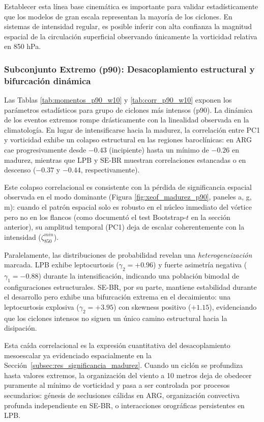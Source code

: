 Establecer esta línea base cinemática es importante para validar estadísticamente que los modelos de gran escala representan la mayoría de los ciclones. En sistemas de intensidad regular, es posible inferir con alta confianza la magnitud espacial de la circulación superficial observando únicamente la vorticidad relativa en 850 hPa.

\subsubsection{Subconjunto Extremo (p90): Desacoplamiento estructural y bifurcación dinámica}

Las Tablas \ref{tab:momentos_p90_w10} y \ref{tab:corr_p90_w10} exponen los parámetros estadísticos para grupo de ciclones más intensos (p90). La dinámica de los eventos extremos rompe drásticamente con la linealidad observada en la climatología. En lugar de intensificarse hacia la madurez, la correlación entre PC1 y vorticidad exhibe un colapso estructural en las regiones baroclínicas: en ARG cae progresivamente desde $-0.43$ (incipiente) hasta un mínimo de $-0.26$ en madurez, mientras que LPB y SE-BR muestran correlaciones estancadas o en descenso ($-0.37$ y $-0.44$, respectivamente). 

Este colapso correlacional es consistente con la pérdida de significancia espacial observada en el modo dominante (Figura \ref{fig:xeof_madurez_p90}, paneles a, g, m): cuando el patrón espacial solo es robusto en el núcleo inmediato del vórtice pero no en los flancos (como documentó el test Bootstrap-$t$ en la sección anterior), su amplitud temporal (PC1) deja de escalar coherentemente con la intensidad ($\zeta_{850}^{min}$).



Paralelamente, las distribuciones de probabilidad revelan una \textit{heterogeneización} marcada. LPB exhibe leptocurtosis ($\gamma_2 = +0.96$) y fuerte asimetría negativa ($\gamma_1 = -0.88$) durante la intensificación, indicando una población bimodal de configuraciones estructurales. SE-BR, por su parte, mantiene estabilidad durante el desarrollo pero exhibe una bifurcación extrema en el decaimiento: una leptocurtosis explosiva ($\gamma_2 = +3.95$) con skewness positivo ($+1.15$), evidenciando que los ciclones intensos no siguen un único camino estructural hacia la disipación.

Esta caída correlacional es la expresión cuantitativa del desacoplamiento mesoescalar ya evidenciado espacialmente en la Sección~\ref{subsec:res_significancia_madurez}. Cuando un ciclón se profundiza hasta valores extremos, la organización del viento a 10 metros deja de obedecer puramente al mínimo de vorticidad y pasa a ser controlada por procesos secundarios: génesis de seclusiones cálidas en ARG, organización convectiva profunda independiente en SE-BR, o interacciones orográficas persistentes en LPB. 

